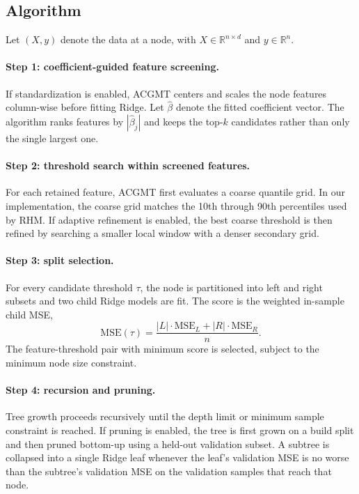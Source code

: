\documentclass[11pt,a4paper]{article}
\begin{document}
\subsection{Algorithm}

Let $(X, y)$ denote the data at a node, with $X \in \mathbb{R}^{n \times d}$ and $y \in \mathbb{R}^n$.

\paragraph{Step 1: coefficient-guided feature screening.}
If standardization is enabled, ACGMT centers and scales the node features column-wise before fitting Ridge. Let $\hat{\beta}$ denote the fitted coefficient vector. The algorithm ranks features by $|\hat{\beta}_j|$ and keeps the top-$k$ candidates rather than only the single largest one.

\paragraph{Step 2: threshold search within screened features.}
For each retained feature, ACGMT first evaluates a coarse quantile grid. In our implementation, the coarse grid matches the 10th through 90th percentiles used by RHM. If adaptive refinement is enabled, the best coarse threshold is then refined by searching a smaller local window with a denser secondary grid.

\paragraph{Step 3: split selection.}
For every candidate threshold $\tau$, the node is partitioned into left and right subsets and two child Ridge models are fit. The score is the weighted in-sample child MSE,
\[
\mathrm{MSE}(\tau) =
\frac{|L| \cdot \mathrm{MSE}_L + |R| \cdot \mathrm{MSE}_R}{n}.
\]
The feature-threshold pair with minimum score is selected, subject to the minimum node size constraint.

\paragraph{Step 4: recursion and pruning.}
Tree growth proceeds recursively until the depth limit or minimum sample constraint is reached. If pruning is enabled, the tree is first grown on a build split and then pruned bottom-up using a held-out validation subset. A subtree is collapsed into a single Ridge leaf whenever the leaf's validation MSE is no worse than the subtree's validation MSE on the validation samples that reach that node.
\end{document}
